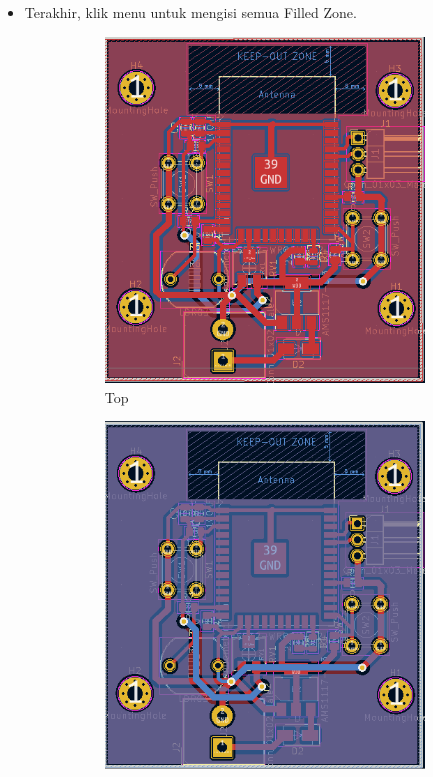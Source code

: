 \documentclass[12pt]{book}
\begin{document}
\begin{itemize}
		\item Terakhir, klik menu  untuk mengisi semua Filled Zone.

		\begin{figure}[!ht]
			\centering
			\begin{subfigure}[t]{0.45\textwidth}
				\includegraphics[width=\textwidth]{images/pcb/pcb_25}
				\caption{Top}
			\end{subfigure}
			\begin{subfigure}[t]{0.45\textwidth}
				\includegraphics[width=\textwidth]{images/pcb/pcb_26}

\end{subfigure}
\end{figure}
\end{itemize}
\end{document}

